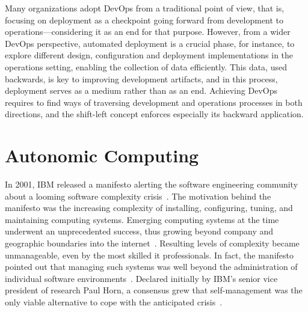 	\begin{InfoBox}
		\begin{description}[style=unboxed,leftmargin=0pt,font=\normalsize\bfseries]
			\item[Shifting operations left by automating software experiments\autodot] Many organizations adopt DevOps from a traditional point of view, that is, focusing on deployment as a checkpoint going forward from development to operations---considering it as an end for that purpose. However, from a wider DevOps perspective, automated deployment is a crucial phase, for instance, to explore different design, configuration and deployment implementations in the operations setting, enabling the collection of data efficiently. This data, used backwards, is key to improving development artifacts, and in this process, deployment serves as a medium rather than as an end. Achieving DevOps requires to find ways of traversing development and operations processes in both directions, and the shift-left concept enforces especially its backward application.


		\end{description}
	\end{InfoBox}



\section{Autonomic Computing}
\label{sect:background--autonomic-computing}

In 2001, IBM released a manifesto alerting the software engineering community about a looming software complexity crisis~\cite{horn-2001-autonomic}. The motivation behind the manifesto was the increasing complexity of installing, configuring, tuning, and maintaining computing systems. Emerging computing systems at the time underwent an unprecedented success, thus growing beyond company and geographic boundaries into the internet~\cite{weyns-2021-introduction}. Resulting levels of complexity became unmanageable, even by the most skilled \gls{it} professionals. In fact, the manifesto pointed out that managing such systems was well beyond the administration of individual software environments~\cite{kephart-2003-vision}. Declared initially by IBM's senior vice president of research Paul Horn, a consensus grew that self-management was the only viable alternative to cope with the anticipated crisis~\cite{horn-2001-autonomic,kephart-2003-vision}.

